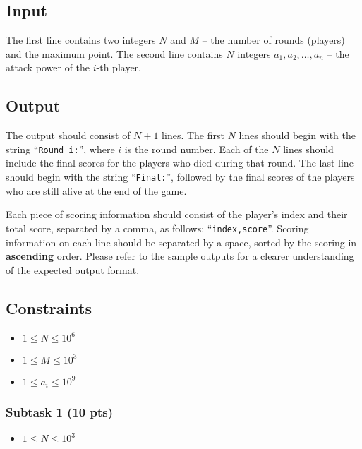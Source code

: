 \subsection{Input}\label{input}

The first line contains two integers $N$ and $M$ -- the number of rounds (players) and the maximum point. 
The second line contains $N$ integers $a_1, a_2, \dots, a_n$ -- the attack power of the $i$-th player.

\subsection{Output}\label{output}

The output should consist of $N+1$ lines. 
The first $N$ lines should begin with the string ``\texttt{Round i:}'', where $i$ is the round number. 
Each of the $N$ lines should include the final scores for the players who died during that round. 
The last line should begin with the string ``\texttt{Final:}'', followed by the final scores of the players who are still alive at the end of the game.

Each piece of scoring information should consist of the player's index and their total score, separated by a comma, as follows: ``\texttt{index,score}''. 
Scoring information on each line should be separated by a space, sorted by the scoring in \textbf{ascending} order.
Please refer to the sample outputs for a clearer understanding of the expected output format. 

\subsection{Constraints} \label{constraint}
\begin{itemize}
\tightlist
    \item $1 \le N \le 10^6$
    \item $1 \le M \le 10^3$
    \item $1 \le a_i \le 10^9$
\end{itemize}

\subsubsection{Subtask 1 (10 pts)}\label{subtask-1-20}

\begin{itemize}
\tightlist
\item $1 \le N \le 10^3$
\end{itemize}

